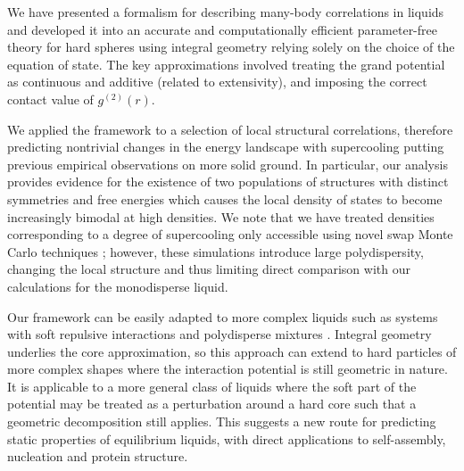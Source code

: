 \documentclass[11pt,twoside]{report}
\begin{document}
We have presented a formalism for describing many-body correlations in liquids and developed it into an accurate and computationally efficient parameter-free theory for hard spheres using integral geometry relying solely on the choice of the equation of state.
The key approximations involved treating the grand potential as continuous and additive (related to extensivity), and imposing the correct contact value of $g^{(2)}(r)$.

We applied the framework to a selection of local structural correlations, therefore predicting nontrivial changes in the energy landscape with supercooling putting previous empirical observations on more solid ground.
In particular, our analysis provides evidence for the existence of two populations of structures with distinct symmetries and free energies which causes the local density of states to become increasingly bimodal at high densities.
We note that we have treated densities corresponding to a degree of supercooling only accessible using novel swap Monte Carlo techniques \cite{BerthierPRL2016}; however, these simulations introduce large polydispersity, changing the local structure \cite{CoslovichJPCM2018} and thus limiting direct comparison with our calculations for the monodisperse liquid.

Our framework can be easily adapted to more complex liquids such as systems with soft repulsive interactions and polydisperse mixtures \cite{KodamaJCP2011}.
Integral geometry underlies the core approximation, so this approach can extend to hard particles of more complex shapes where the interaction potential is still geometric in nature.
It is applicable to a more general class of liquids where the soft part of the potential may be treated as a perturbation around a hard core \cite{Hansen2013} such that a geometric decomposition still applies.
This suggests a new route for predicting static properties of equilibrium liquids, with direct applications to self-assembly, nucleation and protein structure.


\end{document}
